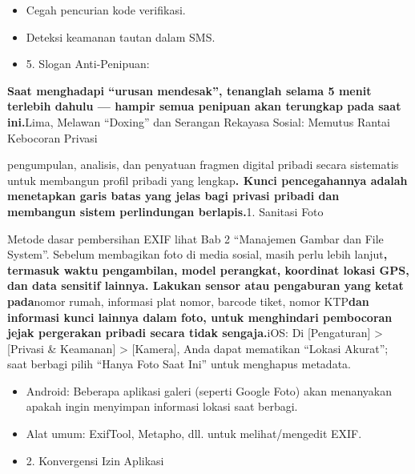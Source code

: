 
\begin{itemize}
  \item Cegah pencurian kode verifikasi.
  \item Deteksi keamanan tautan dalam SMS.
  \item 5. Slogan Anti-Penipuan:
\end{itemize}


\textbf{Saat menghadapi “urusan mendesak”, tenanglah selama 5 menit terlebih dahulu — hampir semua penipuan akan terungkap pada saat ini.}Lima, Melawan “Doxing” dan Serangan Rekayasa Sosial: Memutus Rantai Kebocoran Privasi


pengumpulan, analisis, dan penyatuan fragmen digital pribadi secara sistematis untuk membangun profil pribadi yang lengkap\textbf{. Kunci pencegahannya adalah menetapkan garis batas yang jelas bagi privasi pribadi dan membangun sistem perlindungan berlapis.}1. Sanitasi Foto


Metode dasar pembersihan EXIF lihat Bab 2 “Manajemen Gambar dan File System”. Sebelum membagikan foto di media sosial, masih perlu lebih lanjut\textbf{, termasuk waktu pengambilan, model perangkat, koordinat lokasi GPS, dan data sensitif lainnya. Lakukan sensor atau pengaburan yang ketat pada}nomor rumah, informasi plat nomor, barcode tiket, nomor KTP\textbf{dan informasi kunci lainnya dalam foto, untuk menghindari pembocoran jejak pergerakan pribadi secara tidak sengaja.}iOS: Di [Pengaturan] > [Privasi \& Keamanan] > [Kamera], Anda dapat mematikan “Lokasi Akurat”; saat berbagi pilih “Hanya Foto Saat Ini” untuk menghapus metadata.

\begin{itemize}
  \item Android: Beberapa aplikasi galeri (seperti Google Foto) akan menanyakan apakah ingin menyimpan informasi lokasi saat berbagi.
  \item Alat umum: ExifTool, Metapho, dll. untuk melihat/mengedit EXIF.
  \item 2. Konvergensi Izin Aplikasi
\end{itemize}


